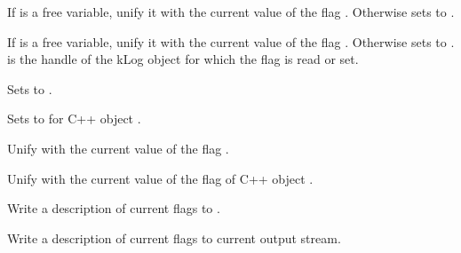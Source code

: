 \begin{description}
If  is a free variable, unify it with the current value of the
flag . Otherwise sets  to .

If  is a free variable, unify it with the current value of the
flag . Otherwise sets  to .  is the handle of
the kLog object for which the flag is read or set.

Sets  to .

Sets  to  for C++ object .

Unify  with the current value of the flag .

Unify  with the current value of the flag  of C++ object .

Write a description of current flags to .

Write a description of current flags to current output stream.
\end{description}

